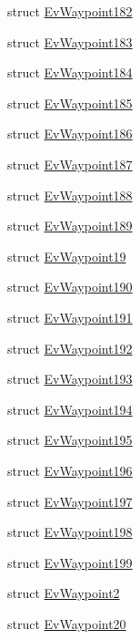 \begin{DoxyCompactItemize}
\item 
struct \hyperlink{structcl__move__base__z_1_1EvWaypoint182}{Ev\+Waypoint182}
\item 
struct \hyperlink{structcl__move__base__z_1_1EvWaypoint183}{Ev\+Waypoint183}
\item 
struct \hyperlink{structcl__move__base__z_1_1EvWaypoint184}{Ev\+Waypoint184}
\item 
struct \hyperlink{structcl__move__base__z_1_1EvWaypoint185}{Ev\+Waypoint185}
\item 
struct \hyperlink{structcl__move__base__z_1_1EvWaypoint186}{Ev\+Waypoint186}
\item 
struct \hyperlink{structcl__move__base__z_1_1EvWaypoint187}{Ev\+Waypoint187}
\item 
struct \hyperlink{structcl__move__base__z_1_1EvWaypoint188}{Ev\+Waypoint188}
\item 
struct \hyperlink{structcl__move__base__z_1_1EvWaypoint189}{Ev\+Waypoint189}
\item 
struct \hyperlink{structcl__move__base__z_1_1EvWaypoint19}{Ev\+Waypoint19}
\item 
struct \hyperlink{structcl__move__base__z_1_1EvWaypoint190}{Ev\+Waypoint190}
\item 
struct \hyperlink{structcl__move__base__z_1_1EvWaypoint191}{Ev\+Waypoint191}
\item 
struct \hyperlink{structcl__move__base__z_1_1EvWaypoint192}{Ev\+Waypoint192}
\item 
struct \hyperlink{structcl__move__base__z_1_1EvWaypoint193}{Ev\+Waypoint193}
\item 
struct \hyperlink{structcl__move__base__z_1_1EvWaypoint194}{Ev\+Waypoint194}
\item 
struct \hyperlink{structcl__move__base__z_1_1EvWaypoint195}{Ev\+Waypoint195}
\item 
struct \hyperlink{structcl__move__base__z_1_1EvWaypoint196}{Ev\+Waypoint196}
\item 
struct \hyperlink{structcl__move__base__z_1_1EvWaypoint197}{Ev\+Waypoint197}
\item 
struct \hyperlink{structcl__move__base__z_1_1EvWaypoint198}{Ev\+Waypoint198}
\item 
struct \hyperlink{structcl__move__base__z_1_1EvWaypoint199}{Ev\+Waypoint199}
\item 
struct \hyperlink{structcl__move__base__z_1_1EvWaypoint2}{Ev\+Waypoint2}
\item 
struct \hyperlink{structcl__move__base__z_1_1EvWaypoint20}{Ev\+Waypoint20}
\item 

\end{DoxyCompactItemize}
